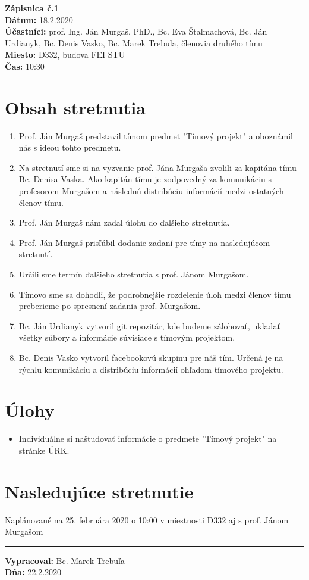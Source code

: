 
\usepackage{parskip}%

	\textbf{{\Huge Zápisnica č.1}}\\
			
	\textbf{Dátum:} 18.2.2020\\	
		
	\textbf{Účastníci:} prof. Ing. Ján Murgaš, PhD., Bc. Eva Štalmachová, Bc. Ján Urdianyk, Bc. Denis Vasko, Bc. Marek Trebuľa, členovia druhého tímu\\
		
	\textbf{Miesto:} D332, budova FEI STU\\	
	
	\textbf{Čas:} 10:30    
    \section*{Obsah stretnutia}
    \begin{enumerate}
    	\item Prof. Ján Murgaš predstavil tímom predmet "Tímový projekt" a oboznámil nás s ideou tohto predmetu.
    	\item Na stretnutí sme si na vyzvanie prof. Jána Murgaša zvolili za kapitána tímu Bc. Denisa Vaska. Ako kapitán tímu je zodpovedný za komunikáciu s profesorom Murgašom a následnú distribúciu informácií medzi ostatných členov tímu.
    	\item Prof. Ján Murgaš nám zadal úlohu do ďalšieho stretnutia.
    	\item Prof. Ján Murgaš prisľúbil dodanie zadaní pre tímy na nasledujúcom\\ stretnutí.
    	\item Určili sme termín ďalšieho stretnutia s prof. Jánom Murgašom.
    	\item Tímovo sme sa dohodli, že podrobnejšie rozdelenie úloh medzi členov tímu preberieme po spresnení zadania prof. Murgašom.
    	\item Bc. Ján Urdianyk vytvoril git repozitár, kde budeme zálohovať, ukladať všetky súbory a informácie súvisiace s tímovým projektom.
    	\item  Bc. Denis Vasko vytvoril facebookovú skupinu pre náš tím. Určená je na rýchlu komunikáciu a distribúciu informácií ohľadom tímového projektu.
    \end{enumerate}    
    \section*{Úlohy}
    \begin{itemize}
    	\item Individuálne si naštudovať informácie o predmete "Tímový projekt" na stránke ÚRK.
    \end{itemize}

    \section*{Nasledujúce stretnutie}
    Naplánované na 25. februára 2020 o 10:00 v miestnosti D332 aj s prof. Jánom Murgašom
    
    \noindent\rule{15cm}{0.4pt}
   {\small 	\textbf{Vypracoval:} Bc. Marek Trebuľa\\
   \textbf{Dňa:} 22.2.2020 }
    


